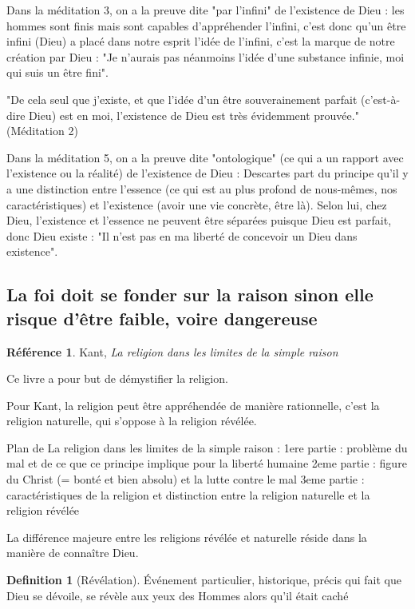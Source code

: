 \documentclass[french]{book}
\theoremstyle{definition}
\newtheorem*{dfn}{Definition}
\newtheorem*{refe}{Référence}
\begin{document}
Dans la méditation 3, on a la preuve dite "par l'infini" de l'existence de Dieu : les hommes sont finis mais sont capables d'appréhender l'infini, c'est donc qu'un être infini (Dieu) a placé dans notre esprit l'idée de l'infini, c'est la marque de notre création par Dieu : "Je n'aurais pas néanmoins l'idée d'une substance infinie, moi qui suis un être fini".

"De cela seul que j'existe, et que l'idée d'un être souverainement parfait (c'est-à-dire Dieu) est en moi, l'existence de Dieu est très évidemment prouvée." (Méditation 2)

Dans la méditation 5, on a la preuve dite "ontologique" (ce qui a un rapport avec l'existence ou la réalité) de l'existence de Dieu : Descartes part du principe qu'il y a une distinction entre l'essence (ce qui est au plus profond de nous-mêmes, nos caractéristiques) et l'existence (avoir une vie concrète, être là). Selon lui, chez Dieu, l'existence et l'essence ne peuvent être séparées puisque Dieu est parfait, donc Dieu existe : "Il n'est pas en ma liberté de concevoir un Dieu dans existence".


\subsection{La foi doit se fonder sur la raison sinon elle risque d'être faible, voire dangereuse}

\begin{refe}
	Kant, \textit{La religion dans les limites de la simple raison}
\end{refe}

Ce livre a pour but de démystifier la religion.

Pour Kant, la religion peut être appréhendée de manière rationnelle, c'est la religion naturelle, qui s'oppose à la religion révélée.

Plan de La religion dans les limites de la simple raison :
1ere partie : problème du mal et de ce que ce principe implique pour la liberté humaine
2eme partie : figure du Christ (= bonté et bien absolu) et la lutte contre le mal
3eme partie : caractéristiques de la religion et distinction entre la religion naturelle et la religion révélée

La différence majeure entre les religions révélée et naturelle réside dans la manière de connaître Dieu.

\begin{dfn}[Révélation]
Événement particulier, historique, précis qui fait que Dieu se dévoile, se révèle aux yeux des Hommes alors qu'il était caché
\end{dfn}
\end{document}
